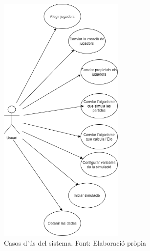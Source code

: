 \documentclass[a4paper]{article}
\newcounter{subsubsubsection}[subsubsection]
\begin{document}
\begin{figure}[H]
    \centering
    \includegraphics[width=0.55\textwidth]{images/Casos d'us.png}
    \caption[Casos d'ús del sistema]{Casos d'ús del sistema. Font: Elaboració pròpia}
    \label{fig:EsquemaCasosD'us}
\end{figure}

\newpage
{}
\addtocounter{posCas}{1}

\end{document}
